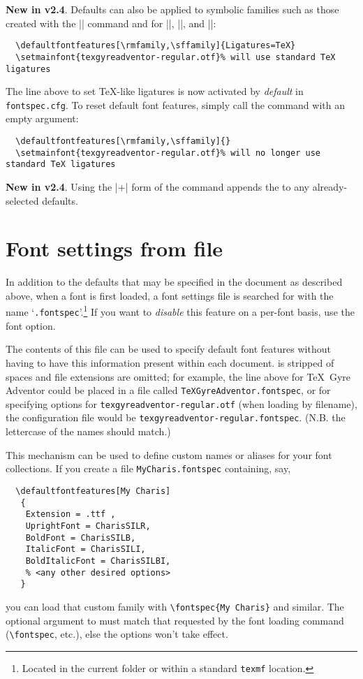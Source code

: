 \textbf{New in v2.4}.
Defaults can also be applied to symbolic families such as those created with the |\newfontfamily| command and for |\rmfamily|, |\sffamily|, and |\ttfamily|:
\begin{Verbatim}
  \defaultfontfeatures[\rmfamily,\sffamily]{Ligatures=TeX}
  \setmainfont{texgyreadventor-regular.otf}% will use standard TeX ligatures
\end{Verbatim}
The line above to set \TeX-like ligatures is now activated by \emph{default} in \texttt{fontspec.cfg}.
To reset default font features, simply call the command with an empty argument:
\begin{Verbatim}
  \defaultfontfeatures[\rmfamily,\sffamily]{}
  \setmainfont{texgyreadventor-regular.otf}% will no longer use standard TeX ligatures
\end{Verbatim}


\textbf{New in v2.4}.
Using the |+| form of the command appends the  to any already-selected defaults.


\section{Font settings from file}

In addition to the defaults that may be specified in the document as described above, when a font is first loaded, a font settings file is searched
for with the name `\texttt{.fontspec}'.\footnote{Located in the current folder or within a standard \texttt{texmf} location.}
If you want to \emph{disable} this feature on a per-font basis, use the  font option.

The contents of this file can be used to specify default font features without
having to have this information present within each document.
 is stripped of spaces and file extensions are omitted; for
example, the line above for \TeX\ Gyre Adventor could be placed in a file
called \texttt{TeXGyreAdventor.fontspec}, or for specifying options for
\texttt{texgyreadventor-regular.otf} (when loading by filename), the configuration
file would be \texttt{texgyreadventor-regular.fontspec}.
(N.B. the lettercase of the names should match.)

This mechanism can be used to define custom names or aliases for your font collections.
If you create a file \texttt{MyCharis.fontspec} containing, say,
\begin{Verbatim}
  \defaultfontfeatures[My Charis]
   {
    Extension = .ttf ,
    UprightFont = CharisSILR,
    BoldFont = CharisSILB,
    ItalicFont = CharisSILI,
    BoldItalicFont = CharisSILBI,
    % <any other desired options>
   }
\end{Verbatim}
you can load that custom family with \verb|\fontspec{My Charis}| and similar.
The optional argument to  must match that requested by the font loading command (\verb|\fontspec|, etc.), else the options won't take effect.

